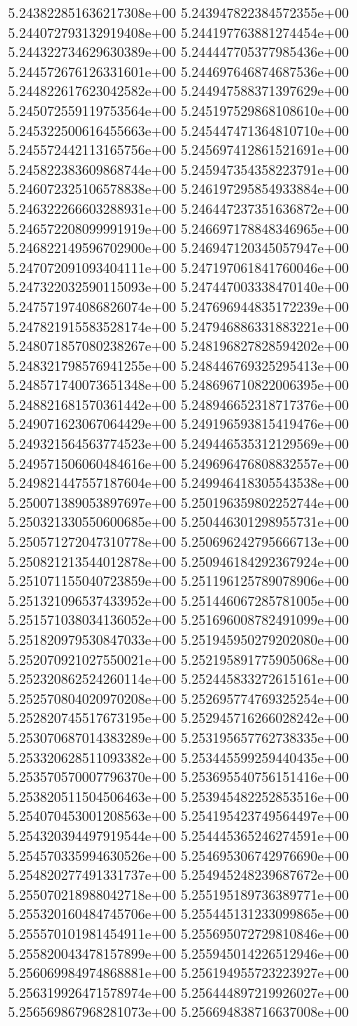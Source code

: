 5.243822851636217308e+00
5.243947822384572355e+00
5.244072793132919408e+00
5.244197763881274454e+00
5.244322734629630389e+00
5.244447705377985436e+00
5.244572676126331601e+00
5.244697646874687536e+00
5.244822617623042582e+00
5.244947588371397629e+00
5.245072559119753564e+00
5.245197529868108610e+00
5.245322500616455663e+00
5.245447471364810710e+00
5.245572442113165756e+00
5.245697412861521691e+00
5.245822383609868744e+00
5.245947354358223791e+00
5.246072325106578838e+00
5.246197295854933884e+00
5.246322266603288931e+00
5.246447237351636872e+00
5.246572208099991919e+00
5.246697178848346965e+00
5.246822149596702900e+00
5.246947120345057947e+00
5.247072091093404111e+00
5.247197061841760046e+00
5.247322032590115093e+00
5.247447003338470140e+00
5.247571974086826074e+00
5.247696944835172239e+00
5.247821915583528174e+00
5.247946886331883221e+00
5.248071857080238267e+00
5.248196827828594202e+00
5.248321798576941255e+00
5.248446769325295413e+00
5.248571740073651348e+00
5.248696710822006395e+00
5.248821681570361442e+00
5.248946652318717376e+00
5.249071623067064429e+00
5.249196593815419476e+00
5.249321564563774523e+00
5.249446535312129569e+00
5.249571506060484616e+00
5.249696476808832557e+00
5.249821447557187604e+00
5.249946418305543538e+00
5.250071389053897697e+00
5.250196359802252744e+00
5.250321330550600685e+00
5.250446301298955731e+00
5.250571272047310778e+00
5.250696242795666713e+00
5.250821213544012878e+00
5.250946184292367924e+00
5.251071155040723859e+00
5.251196125789078906e+00
5.251321096537433952e+00
5.251446067285781005e+00
5.251571038034136052e+00
5.251696008782491099e+00
5.251820979530847033e+00
5.251945950279202080e+00
5.252070921027550021e+00
5.252195891775905068e+00
5.252320862524260114e+00
5.252445833272615161e+00
5.252570804020970208e+00
5.252695774769325254e+00
5.252820745517673195e+00
5.252945716266028242e+00
5.253070687014383289e+00
5.253195657762738335e+00
5.253320628511093382e+00
5.253445599259440435e+00
5.253570570007796370e+00
5.253695540756151416e+00
5.253820511504506463e+00
5.253945482252853516e+00
5.254070453001208563e+00
5.254195423749564497e+00
5.254320394497919544e+00
5.254445365246274591e+00
5.254570335994630526e+00
5.254695306742976690e+00
5.254820277491331737e+00
5.254945248239687672e+00
5.255070218988042718e+00
5.255195189736389771e+00
5.255320160484745706e+00
5.255445131233099865e+00
5.255570101981454911e+00
5.255695072729810846e+00
5.255820043478157899e+00
5.255945014226512946e+00
5.256069984974868881e+00
5.256194955723223927e+00
5.256319926471578974e+00
5.256444897219926027e+00
5.256569867968281073e+00
5.256694838716637008e+00
